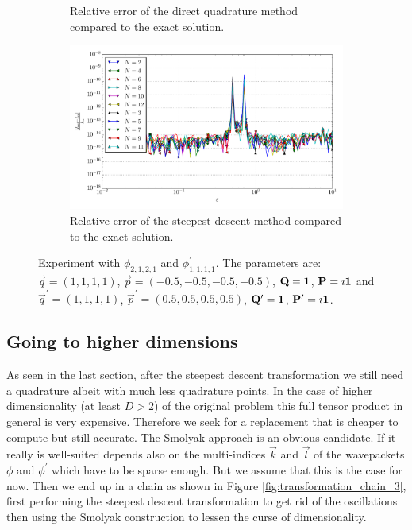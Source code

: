 \documentclass[a4paper,10pt]{article}
\begin{document}
\begin{figure}[ht!]
\begin{subfigure}[t]{0.5\linewidth}
    \caption{Relative error of the direct quadrature method compared to the exact solution.}
    \label{fig:tp_4d_conv_eps_2121_1111_err_rel_qr}
  \end{subfigure}
  \begin{subfigure}[t]{0.5\linewidth}
    \includegraphics[width=\linewidth]{./plots/tp_4d_conv_eps_(2,1,2,1)_(1,1,1,1)_err_rel_nsd.pdf}
    \caption{Relative error of the steepest descent method compared to the exact solution.}
    \label{fig:tp_4d_conv_eps_2121_1111_err_rel_nsd}
  \end{subfigure}
  \label{fig:tp_4d_conv_eps_2121_1111}
  \caption{Experiment with $\phi_{2,1,2,1}$ and $\phi_{1,1,1,1}^{\prime}$.
  The parameters are:
  $\vec{q} = (1, 1, 1, 1)$,
  $\vec{p} = (-0.5, -0.5, -0.5, -0.5)$,
  $\mathbf{Q} = \mathbf{1}$,
  $\mathbf{P} = \imath \mathbf{1}$
  and
  $\vec{q}^\prime = (1, 1, 1, 1)$,
  $\vec{p}^\prime = (0.5, 0.5, 0.5, 0.5)$,
  $\mathbf{Q}^\prime = \mathbf{1}$,
  $\mathbf{P}^\prime = \imath \mathbf{1}$.}
\end{figure}


\FloatBarrier
\subsection{Going to higher dimensions}


As seen in the last section, after the steepest descent transformation we still
need a quadrature albeit with much less quadrature points. In the case of higher
dimensionality (at least $D > 2$) of the original problem this full tensor product
in general is very expensive. Therefore we seek for a replacement that is cheaper
to compute but still accurate. The Smolyak approach is an obvious candidate.
If it really is well-suited depends also on the multi-indices $\vec{k}$ and
$\vec{l}$ of the wavepackets $\phi$ and $\phi^\prime$ which have to be sparse
enough. But we assume that this is the case for now. Then we end up in a chain
as shown in Figure \ref{fig:transformation_chain_3}, first performing the steepest
descent transformation to get rid of the oscillations then using the Smolyak
construction to lessen the curse of dimensionality.
\end{document}

